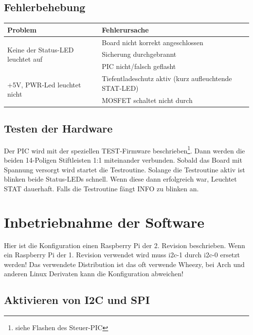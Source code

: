 \documentclass[a4paper,10pt]{article}
\begin{document}
\subsection{Fehlerbehebung}

\begin{center}
    \begin{tabular}{| l | p{6cm} |}
    \hline
    Problem 							& Fehlerursache \\ \hline
    \multirow{3}{*}{Keine der Status-LED leuchtet auf}
	& Board nicht korrekt angeschlossen \\ \cline{2-2}
	& Sicherung durchgebrannt \\ \cline{2-2}
	& PIC nicht/falsch geflasht \\
    \hline
    \multirow{2}{*}{+5V, PWR-Led leuchtet nicht}
	& Tiefentladeschutz aktiv (kurz aufleuchtende STAT-LED) \\ \cline{2-2}
	& MOSFET schaltet nicht durch \\
    \hline
    \end{tabular}
\end{center}

\subsection{Testen der Hardware}

Der PIC wird mit der speziellen TEST-Firmware beschrieben\footnote{siehe Flashen des Steuer-PIC}. Dann werden die beiden 14-Poligen Stiftleisten 1:1 miteinander verbunden. Sobald das Board mit Spannung versorgt wird startet die Testroutine. Solange die Testroutine aktiv ist blinken beide Status-LEDs schnell. Wenn diese dann erfolgreich war, Leuchtet STAT dauerhaft. Falls die Testroutine fängt INFO zu blinken an.

\newpage

\section{Inbetriebnahme der Software}

Hier ist die Konfiguration einen Raspberry Pi der 2. Revision beschrieben. Wenn ein Raspberry Pi der 1. Revision verwendet wird muss i2c-1 durch i2c-0 ersetzt werden! Das verwendete Distribution ist das oft verwende Wheezy, bei Arch und anderen Linux Derivaten kann die Konfiguration abweichen!

\subsection{Aktivieren von I2C und SPI}
\end{document}
